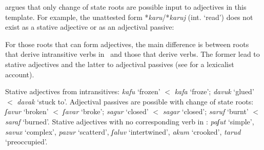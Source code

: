 \begin{exe}
\begin{xlist}
\begin{exe}
\begin{xlist}
\begin{exe}
\begin{exe}
\begin{xlist}
\begin{exe}
\begin{exe}
\begin{xlist}
\begin{exe}
\begin{xlist}
\begin{exe}
\begin{xlist}
\begin{exe}
\begin{xlist}
\begin{exe}
\begin{xlist}
\begin{xlist}
\begin{exe}
\begin{xlist}
\begin{exe}
\begin{xlist}
\begin{exe}
\begin{exe}
\begin{exe}
\begin{xlist}
\begin{exe}
\begin{exe}
\begin{xlist}
\begin{exe}
\begin{xlist}
\begin{exe}
\begin{xlist}
\begin{exe}
\begin{xlist}
\begin{xlist}
\begin{exe}
\begin{xlist}
\begin{exe}
\begin{xlist}
\begin{exe}
\begin{xlist}
\begin{exe}
\begin{xlist}
\begin{exe}
\begin{exe}
\begin{exe}
\begin{exe}
\begin{exe}
\begin{xlist}
\begin{xlist}
\begin{exe}
\begin{xlist}
\begin{exe}
\begin{xlist}
\begin{exe}
\cite{doron00} argues that only change of state roots are possible input to adjectives in this template. For example, the unattested form *\emph{karu}/*\emph{karuj} (int. `read') does not exist as a stative adjective or as an adjectival passive:
 \begin{exe}
  
 \z 

For those roots that can form adjectives, the main difference is between roots that derive intransitive verbs in \tkal~and those that derive  verbs. The former lead to stative adjectives and the latter to adjectival passives (see \citealt{meltzerasscher11} for a lexicalist account).
 \begin{exe}
 \ex   \label{ex:5n49}
 \begin{xlist} 
   \ex  Stative adjectives from intransitives: \emph{kafu} `frozen' $<$ \emph{kafa} `froze'; \emph{davuk} `glued' $<$ \emph{davak} `stuck to'.  
   \ex  Adjectival passives are possible with change of state roots: \emph{ʃavur} `broken' $<$ \emph{ʃavar} `broke'; \emph{sagur} `closed' $<$ \emph{sagar} `closed'; \emph{saruf} `burnt' $<$ \emph{saraf} `burned'.  
   \ex  Stative adjectives with no corresponding verb in \tkal: \emph{paʃut} `simple', \emph{savux} `complex', \emph{pazur} `scatterd', \emph{ʃaluv} `intertwined', \emph{akum} `crooked', \emph{tarud} `preoccupied'. 
   \z
\z 

\end{xlist}
\end{exe}
\end{exe}
\end{exe}
\end{xlist}
\end{exe}
\end{xlist}
\end{exe}
\end{xlist}
\end{xlist}
\end{exe}
\end{exe}
\end{exe}
\end{exe}
\end{exe}
\end{xlist}
\end{exe}
\end{xlist}
\end{exe}
\end{xlist}
\end{exe}
\end{xlist}
\end{exe}
\end{xlist}
\end{xlist}
\end{exe}
\end{xlist}
\end{exe}
\end{xlist}
\end{exe}
\end{xlist}
\end{exe}
\end{exe}
\end{xlist}
\end{exe}
\end{exe}
\end{exe}
\end{xlist}
\end{exe}
\end{xlist}
\end{exe}
\end{xlist}
\end{xlist}
\end{exe}
\end{xlist}
\end{exe}
\end{xlist}
\end{exe}
\end{xlist}
\end{exe}
\end{xlist}
\end{exe}
\end{exe}
\end{xlist}
\end{exe}
\end{exe}
\end{xlist}
\end{exe}
\end{xlist}
\end{exe}
